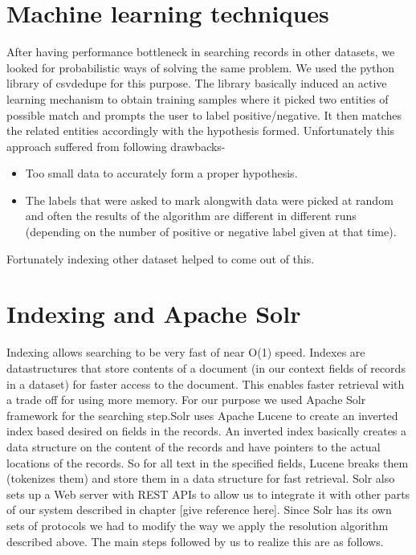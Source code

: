 \section{Machine learning techniques}

        After having performance bottleneck in searching records in other datasets, we looked for probabilistic ways of solving the same problem. We used the python library of csvdedupe for this purpose. The library basically induced an active learning mechanism to obtain training samples where it picked two entities of possible match and prompts the user to label positive/negative. It then matches the related entities accordingly with the hypothesis formed. Unfortunately this approach suffered from following drawbacks-
        \begin{itemize}
        \item Too small data to accurately form a proper hypothesis. 
        \item The labels that were asked to mark alongwith data were picked at random and often the results of the algorithm are different in different runs (depending on the number of positive or negative label given at that time).
        \end{itemize}
        Fortunately indexing other dataset helped to come out of this.

\section{Indexing and Apache Solr}
        Indexing allows searching to be very fast of near O(1) speed. Indexes are datastructures that store contents of a document (in our context fields of records in a dataset) for faster access to the document. This enables faster retrieval with a trade off for using more memory. For our purpose we used Apache Solr framework for the searching step.Solr uses Apache Lucene to create an inverted index based desired on fields in the records. An inverted index basically creates a data structure on the content of the records and have pointers to the actual locations of the records. So for all text in the specified fields, Lucene breaks them (tokenizes them) and store them in a data structure for fast retrieval.  Solr also sets up a  Web server with REST APIs to allow us to integrate it with other parts of our system described in chapter [give reference here]. 
        Since Solr has its own sets of protocols we had to modify the way we apply the resolution algorithm described above. The main steps followed by us to realize this are as follows. 


